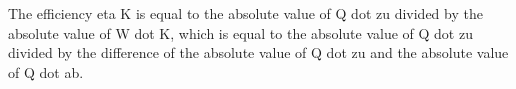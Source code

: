 The efficiency eta K is equal to the absolute value of Q dot zu divided by the absolute value of W dot K, which is equal to the absolute value of Q dot zu divided by the difference of the absolute value of Q dot zu and the absolute value of Q dot ab.